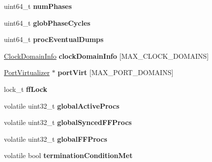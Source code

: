\begin{DoxyCompactItemize}
\item 
\hypertarget{structGlobSimInfo_a09a6d317523c2d43cff987cbcde4e81f}{uint64\-\_\-t {\bfseries num\-Phases}}\label{structGlobSimInfo_a09a6d317523c2d43cff987cbcde4e81f}

\item 
\hypertarget{structGlobSimInfo_a9726d93b4bc12ef3dde688e8683957ab}{uint64\-\_\-t {\bfseries glob\-Phase\-Cycles}}\label{structGlobSimInfo_a9726d93b4bc12ef3dde688e8683957ab}

\item 
\hypertarget{structGlobSimInfo_a3d33a3c963397be81bac3c2b37a12ad2}{uint64\-\_\-t {\bfseries proc\-Eventual\-Dumps}}\label{structGlobSimInfo_a3d33a3c963397be81bac3c2b37a12ad2}

\item 
\hypertarget{structGlobSimInfo_a2df56e0e4bb8ee3da059df8365f10529}{\hyperlink{structClockDomainInfo}{Clock\-Domain\-Info} {\bfseries clock\-Domain\-Info} \mbox{[}M\-A\-X\-\_\-\-C\-L\-O\-C\-K\-\_\-\-D\-O\-M\-A\-I\-N\-S\mbox{]}}\label{structGlobSimInfo_a2df56e0e4bb8ee3da059df8365f10529}

\item 
\hypertarget{structGlobSimInfo_a528834c5ab435e3fe8452139467e2c8a}{\hyperlink{classPortVirtualizer}{Port\-Virtualizer} $\ast$ {\bfseries port\-Virt} \mbox{[}M\-A\-X\-\_\-\-P\-O\-R\-T\-\_\-\-D\-O\-M\-A\-I\-N\-S\mbox{]}}\label{structGlobSimInfo_a528834c5ab435e3fe8452139467e2c8a}

\item 
\hypertarget{structGlobSimInfo_a69cf10fef90638b9442e849732937c97}{lock\-\_\-t {\bfseries ff\-Lock}}\label{structGlobSimInfo_a69cf10fef90638b9442e849732937c97}

\item 
\hypertarget{structGlobSimInfo_a072ea87d58891afc429f6d8bc37e9898}{volatile uint32\-\_\-t {\bfseries global\-Active\-Procs}}\label{structGlobSimInfo_a072ea87d58891afc429f6d8bc37e9898}

\item 
\hypertarget{structGlobSimInfo_a27cc07be244ada17af3453860edf98c6}{volatile uint32\-\_\-t {\bfseries global\-Synced\-F\-F\-Procs}}\label{structGlobSimInfo_a27cc07be244ada17af3453860edf98c6}

\item 
\hypertarget{structGlobSimInfo_a8fad466dcb1b5bd3fd57b33b4d232856}{volatile uint32\-\_\-t {\bfseries global\-F\-F\-Procs}}\label{structGlobSimInfo_a8fad466dcb1b5bd3fd57b33b4d232856}

\item 
\hypertarget{structGlobSimInfo_adb965860c8fffe9b725c5f6c93d44312}{volatile bool {\bfseries termination\-Condition\-Met}}\label{structGlobSimInfo_adb965860c8fffe9b725c5f6c93d44312}


\end{DoxyCompactItemize}
